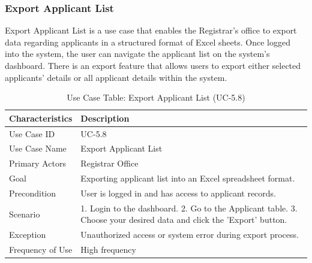\subsubsection{Export Applicant List}
Export Applicant List is a use case that enables the Registrar’s office to export data regarding applicants in a structured format of Excel sheets. Once logged into the system, the user can navigate the applicant list on the system’s dashboard. There is an export feature that allows users to export either selected applicants’ details or all applicant details within the system.
\begin{table}[H]
    \centering
    \small
    \renewcommand{\arraystretch}{1.4}
    \caption{Use Case Table: Export Applicant List (UC-5.8)} %
    \label{tab:export-applicant-list-registrar}
    \begin{tabularx}{\textwidth}{|l|X|}
        \hline
        \rowcolor[gray]{0.9} {Characteristics} & {Description} \\ \hline
        Use Case ID & UC-5.8 \\ \hline
        Use Case Name & Export Applicant List \\ \hline
        Primary Actors & Registrar Office \\ \hline
        Goal & Exporting applicant list into an Excel spreadsheet format. \\ \hline
        Precondition & User is logged in and has access to applicant records. \\ \hline
        Scenario & 1. Login to the dashboard. 2. Go to the Applicant table. 3. Choose your desired data and click the 'Export' button. \\ \hline
        Exception & Unauthorized access or system error during export process. \\ \hline
        Frequency of Use & High frequency \\ \hline
    \end{tabularx}
\end{table}
\FloatBarrier